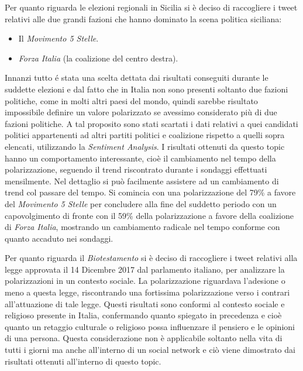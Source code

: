 Per quanto riguarda le elezioni regionali in Sicilia si è deciso di raccogliere i tweet relativi alle due grandi fazioni che hanno dominato la scena politica siciliana:
\begin{itemize}
\item  Il \textit{Movimento 5 Stelle}. 
\item \textit{Forza Italia} (la coalizione del centro destra).
\end{itemize}
Innanzi tutto \'e stata una scelta dettata dai risultati conseguiti durante le suddette elezioni e dal fatto che in Italia non sono presenti soltanto due fazioni politiche, come in molti altri paesi del mondo, quindi sarebbe risultato impossibile definire un valore polarizzato se avessimo considerato più di due fazioni politiche.
A tal proposito sono stati scartati i dati relativi a quei candidati politici appartenenti ad altri partiti politici e coalizione rispetto a quelli sopra elencati, utilizzando la \textit{Sentiment Analysis}.
I risultati ottenuti da questo topic hanno un comportamento interessante, cioè il cambiamento nel tempo della polarizzazione, seguendo il trend riscontrato durante i sondaggi effettuati mensilmente. Nel dettaglio si può facilmente assistere ad un cambiamento di trend col passare del tempo.
Si comincia con una polarizzazione del 79\% a favore del \textit{Movimento 5 Stelle} per concludere alla fine del suddetto periodo con un capovolgimento di fronte con il 59\% della polarizzazione a favore della coalizione di \textit{Forza Italia}, mostrando un cambiamento radicale nel tempo conforme con quanto accaduto nei sondaggi.

Per quanto riguarda il \textit{Biotestamento} si è deciso di raccogliere i tweet relativi alla legge approvata il 14 Dicembre 2017 dal parlamento italiano, per analizzare la polarizzazioni in un contesto sociale.
La polarizzazione riguardava l'adesione o meno a questa legge, riscontrando una fortissima polarizzazione verso i contrari all'attuazione di tale legge. %
Questi risultati sono conformi al contesto sociale e religioso presente in Italia, confermando quanto spiegato in precedenza e cioè quanto un retaggio culturale o religioso possa influenzare il pensiero e le opinioni di una persona. Questa considerazione non è applicabile soltanto nella vita di tutti i giorni ma anche all'interno di un social network e ciò viene dimostrato dai risultati ottenuti all'interno di questo topic.

